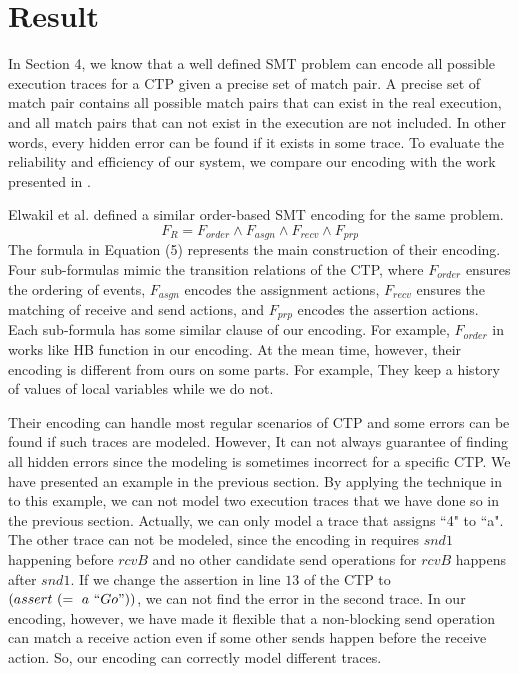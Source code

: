 \section{Result} 
In Section 4, we know that a well defined SMT problem can encode all possible execution traces for a CTP given a precise set of match pair. A precise set of match pair contains all possible match pairs that can exist in the real execution, and all match pairs that can not exist in the execution are not included. In other words, every hidden error can be found if it exists in some trace. To evaluate the reliability and efficiency of our system, we compare our encoding with the work presented in \cite{elwakil:padtad10}.

Elwakil et al. defined a similar order-based SMT encoding for the same problem.
\begin{equation}
F_R = F_{order}\wedge F_{asgn}\wedge F_{recv}\wedge F_{prp}
\end{equation}
The formula in Equation (5) represents the main construction of their encoding. Four sub-formulas mimic the transition relations of the CTP, where $F_{order}$ ensures the ordering of events, $F_{asgn}$ encodes the assignment actions, $F_{recv}$ ensures the matching of receive and send actions, and $F_{prp}$ encodes the assertion actions. Each sub-formula has some similar clause of our encoding. For example, $F_{order}$ in \cite{elwakil:padtad10} works like HB function in our encoding. At the mean time, however, their encoding is different from ours on some parts. For example, They keep a history of values of local variables while we do not.

Their encoding can handle most regular scenarios of CTP and some errors can be found if such traces are modeled. However, It can not always guarantee of finding all hidden errors since the modeling is sometimes incorrect for a specific CTP. We have presented an example in the previous section. By applying the technique in \cite{elwakil:padtad10} to this example, we can not model two execution traces that we have done so in the previous section. Actually, we can only model a trace that assigns ``4" to ``a". The other trace can not be modeled, since the encoding in \cite{elwakil:padtad10} requires $snd1$ happening before $rcvB$ and no other candidate send operations for $rcvB$ happens after $snd1$. If we change the assertion in line $13$ of the CTP to $(assert\ (=\ a\ ``Go"))$, we can not find the error in the second trace. In our encoding, however, we have made it flexible that a non-blocking send operation can match a receive action even if some other sends happen before the receive action. So, our encoding can correctly model different traces.


